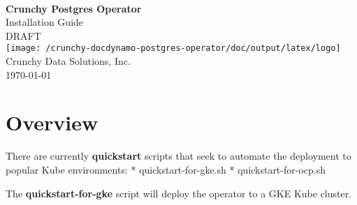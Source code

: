 \documentclass[letterpaper,12pt]{article}
\let\stdsection\section
\renewcommand\section{\newpage\stdsection}
\begin{document}
\hypersetup{pageanchor=false}

\makeatletter
    \begin{titlepage}
        \begin{center}
            {\large \ }\\[18ex]
            {\huge \bfseries Crunchy Postgres Operator}\\[1ex]
            {\large Installation Guide}\\[12ex]
            {\large DRAFT}\\[12ex]
            \texttt{[image: /crunchy-docdynamo-postgres-operator/doc/output/latex/logo]}\\[12ex]
            {\large Crunchy Data Solutions, Inc.}\\[1ex]
            {\large \today}
        \end{center}
    \end{titlepage}
\makeatother
\thispagestyle{empty}
\newpage

\hypersetup{pageanchor=true}

\setcounter{tocdepth}{3}
\thispagestyle{plain}
\renewcommand\contentsname{Table of Contents}
\tableofcontents


\section{Overview}\label{/_overview}

There are currently \textbf{quickstart} scripts that seek to automate the deployment to popular Kube environments: * quickstart-for-gke.sh * quickstart-for-ocp.sh

The \textbf{quickstart-for-gke} script will deploy the operator to a GKE Kube cluster.
\end{document}
